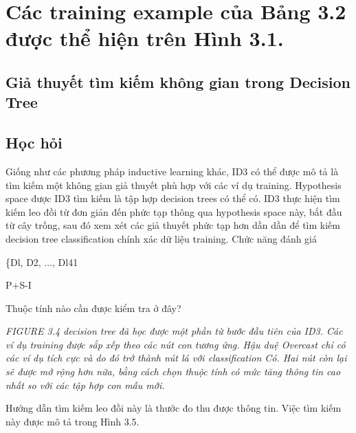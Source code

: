 \section{Các training example của Bảng 3.2 được thể hiện trên Hình 3.1.}

\subsection{Giả thuyết tìm kiếm không gian trong Decision Tree}

\subsection{Học hỏi}

Giống như các phương pháp inductive learning khác, ID3 có thể được mô tả là tìm kiếm một không gian giả thuyết phù hợp với các ví dụ training. Hypothesis space được ID3 tìm kiếm là tập hợp decision trees có thể có. ID3 thực hiện tìm kiếm leo đồi từ đơn giản đến phức tạp thông qua hypothesis space này, bắt đầu từ cây trống, sau đó xem xét các giả thuyết phức tạp hơn dần dần để tìm kiếm decision tree classification chính xác dữ liệu training. Chức năng đánh giá

\{Dl, D2, ..., Dl41

P+S-I

Thuộc tính nào cần được kiểm tra ở đây?

\noindent\textit{FIGURE 3.4 decision tree đã học được một phần từ bước đầu tiên của ID3. Các ví dụ training được sắp xếp theo các nút con tương ứng. Hậu duệ Overcast chỉ có các ví dụ tích cực và do đó trở thành nút lá với classification Có. Hai nút còn lại sẽ được mở rộng hơn nữa, bằng cách chọn thuộc tính có mức tăng thông tin cao nhất so với các tập hợp con mẫu mới.}

Hướng dẫn tìm kiếm leo đồi này là thước đo thu được thông tin. Việc tìm kiếm này được mô tả trong Hình 3.5.

